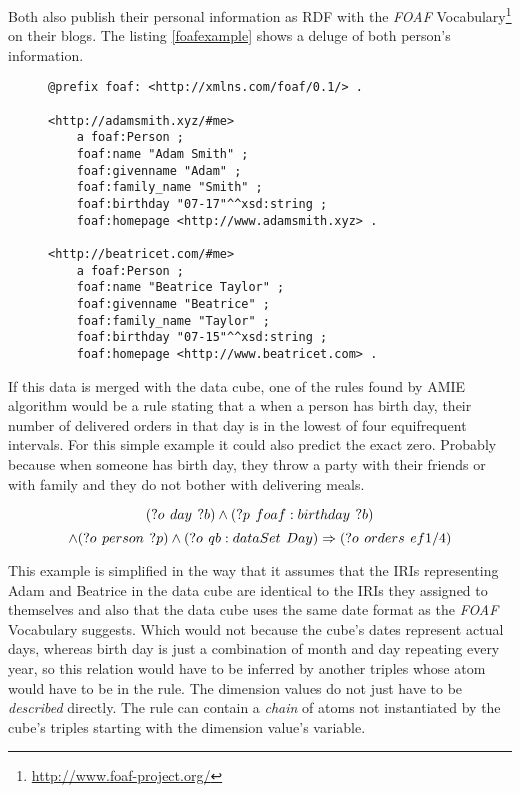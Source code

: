 Both also publish their personal information as RDF with the \textit{FOAF} Vocabulary\footnote{\href{http://www.foaf-project.org/}{http://www.foaf-project.org/}} on their blogs. The listing \ref{foafexample} shows a deluge of both person's information.

\begin{figure}[h]
\begin{lstlisting}[language = turtle, caption={RDF data published on Adam's and Beatrice's personal blogs}, label={foafexample},captionpos=b escapeinside={(*@}{@*)}]
@prefix foaf: <http://xmlns.com/foaf/0.1/> .

<http://adamsmith.xyz/#me>
    a foaf:Person ;
    foaf:name "Adam Smith" ;
    foaf:givenname "Adam" ;
    foaf:family_name "Smith" ;
    foaf:birthday "07-17"^^xsd:string ;
    foaf:homepage <http://www.adamsmith.xyz> .
      
<http://beatricet.com/#me>
    a foaf:Person ;
    foaf:name "Beatrice Taylor" ;
    foaf:givenname "Beatrice" ;
    foaf:family_name "Taylor" ;
    foaf:birthday "07-15"^^xsd:string ;
    foaf:homepage <http://www.beatricet.com> .
\end{lstlisting}
\end{figure}

If this data is merged with the data cube, one of the rules found by AMIE algorithm would be a rule stating that a when a person has birth day, their number of delivered orders in that day is in the lowest of four equifrequent intervals. For this simple example it could also predict the exact zero. Probably because when someone has birth day, they throw a party with their friends or with family and they do not bother with delivering meals.

$$
(?o\hspace{0.4em}day\hspace{0.4em}?b) \land (?p\hspace{0.4em}foaf:birthday\hspace{0.4em}?b)
$$
$$ 
\land (?o\hspace{0.4em}person\hspace{0.4em}?p) \land (?o\hspace{0.4em}qb:dataSet\hspace{0.4em}Day)  \Rightarrow (?o\hspace{0.4em}orders\hspace{0.4em}ef1/4) 
$$

This example is simplified in the way that it assumes that the IRIs representing Adam and Beatrice in the data cube are identical to the IRIs they assigned to themselves and also that the data cube uses the same date format as the \textit{FOAF} Vocabulary suggests. Which would not because the cube's dates represent actual days, whereas birth day is just a combination of month and day repeating every year, so this relation would have to be inferred by another triples whose atom would have to be in the rule. The dimension values do not just have to be \textit{described} directly. The rule can contain a \textit{chain} of atoms not instantiated by the cube's triples starting with the dimension value's variable.


